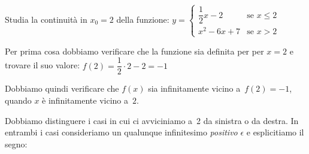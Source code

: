 \vspace{1em}

\begin{esempio}
Studia la continuità in \(x_0=2\) della funzione: 
\(y=\begin{cases} 
    \dfrac{1}{2}x-2 & \text{se } x \leqslant 2 \\ 
    x^2-6x+7 & \text{se } x > 2
  \end{cases}\)

Per prima cosa dobbiamo verificare che la funzione sia definita per 
per \(x=2\) e trovare il suo valore: 
\(f(2) = \dfrac{1}{2} \cdot 2-2 = -1\)

Dobbiamo quindi verificare che \(f(x)\) sia infinitamente vicino 
a~\(f(2) = -1\), quando \(x\) è infinitamente vicino a~\(2\).

Dobbiamo distinguere i casi in cui ci avviciniamo a~2 da sinistra o da 
destra. In entrambi i casi consideriamo un qualunque infinitesimo 
\emph{positivo} \(\epsilon\) e esplicitiamo il segno:

\end{esempio}

